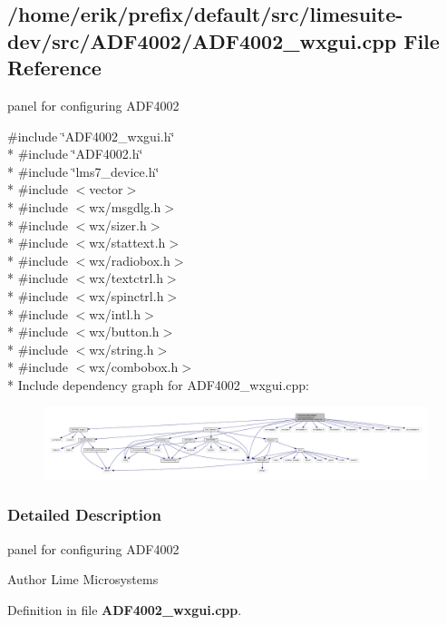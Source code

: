 \subsection{/home/erik/prefix/default/src/limesuite-\/dev/src/\+A\+D\+F4002/\+A\+D\+F4002\+\_\+wxgui.cpp File Reference}
\label{ADF4002__wxgui_8cpp}


panel for configuring A\+D\+F4002  


{\ttfamily \#include \char`\"{}A\+D\+F4002\+\_\+wxgui.\+h\char`\"{}}\\*
{\ttfamily \#include \char`\"{}A\+D\+F4002.\+h\char`\"{}}\\*
{\ttfamily \#include \char`\"{}lms7\+\_\+device.\+h\char`\"{}}\\*
{\ttfamily \#include $<$vector$>$}\\*
{\ttfamily \#include $<$wx/msgdlg.\+h$>$}\\*
{\ttfamily \#include $<$wx/sizer.\+h$>$}\\*
{\ttfamily \#include $<$wx/stattext.\+h$>$}\\*
{\ttfamily \#include $<$wx/radiobox.\+h$>$}\\*
{\ttfamily \#include $<$wx/textctrl.\+h$>$}\\*
{\ttfamily \#include $<$wx/spinctrl.\+h$>$}\\*
{\ttfamily \#include $<$wx/intl.\+h$>$}\\*
{\ttfamily \#include $<$wx/button.\+h$>$}\\*
{\ttfamily \#include $<$wx/string.\+h$>$}\\*
{\ttfamily \#include $<$wx/combobox.\+h$>$}\\*
Include dependency graph for A\+D\+F4002\+\_\+wxgui.\+cpp\+:
\nopagebreak
\begin{figure}[H]
\begin{center}
\leavevmode
\includegraphics[width=350pt]{d9/daa/ADF4002__wxgui_8cpp__incl}
\end{center}
\end{figure}


\subsubsection{Detailed Description}
panel for configuring A\+D\+F4002 

\begin{DoxyAuthor}{Author}
Lime Microsystems 
\end{DoxyAuthor}


Definition in file {\bf A\+D\+F4002\+\_\+wxgui.\+cpp}.

